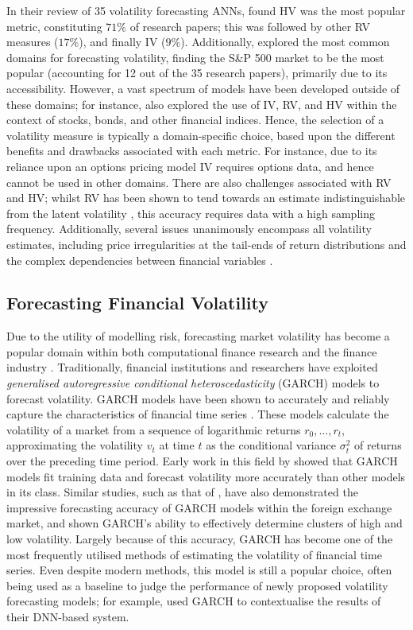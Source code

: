 \documentclass[a4paper, 11pt]{report}
\begin{document}
    In their review of 35 volatility forecasting ANNs, \citet{ge-2022} found HV was the most popular metric, constituting $71\%$ of research papers; this was followed by other RV measures ($17\%$), and finally IV ($9\%$). Additionally, \citet{ge-2022} explored the most common domains for forecasting volatility, finding the S\&P 500 market to be the most popular (accounting for 12 out of the 35 research papers), primarily due to its accessibility. However, a vast spectrum of models have been developed outside of these domains; for instance, \citet{ge-2022} also explored the use of IV, RV, and HV within the context of stocks, bonds, and other financial indices. Hence, the selection of a volatility measure is typically a domain-specific choice, based upon the different benefits and drawbacks associated with each metric. For instance, due to its reliance upon an options pricing model IV requires options data, and hence cannot be used in other domains. There are also challenges associated with RV and HV; whilst RV has been shown to tend towards an estimate indistinguishable from the latent volatility \citep{andersen-2001}, this accuracy requires data with a high sampling frequency. Additionally, several issues unanimously encompass all volatility estimates, including price irregularities at the tail-ends of return distributions \citep{ozbayoglu-2020} and the complex dependencies between financial variables \citep{timmermann-2004}.


    \subsection{Forecasting Financial Volatility}

    Due to the utility of modelling risk, forecasting market volatility has become a popular domain within both computational finance research \citep{ozbayoglu-2020} and the finance industry \citep{chartis-2019}. Traditionally, financial institutions and researchers have exploited \emph{generalised autoregressive conditional heteroscedasticity} (GARCH) models to forecast volatility. GARCH models have been shown to accurately and reliably capture the characteristics of financial time series \citep{lahmiri-2017}. These models calculate the volatility of a market from a sequence of logarithmic returns $r_0, \dots, r_t$, approximating the volatility $v_t$ at time $t$ as the conditional variance $\sigma_{t}^2$ of returns over the preceding time period. Early work in this field by \citet{akgiray-1989} showed that GARCH models fit training data and forecast volatility more accurately than other models in its class. Similar studies, such as that of \citet{hansen-2005}, have also demonstrated the impressive forecasting accuracy of GARCH models within the foreign exchange market, and shown GARCH's ability to effectively determine clusters of high and low volatility. Largely because of this accuracy, GARCH has become one of the most frequently utilised methods of estimating the volatility of financial time series. Even despite modern methods, this model is still a popular choice, often being used as a baseline to judge the performance of newly proposed volatility forecasting models; for example, \citet{rodikov-2022} used GARCH to contextualise the results of their DNN-based system.
\end{document}
